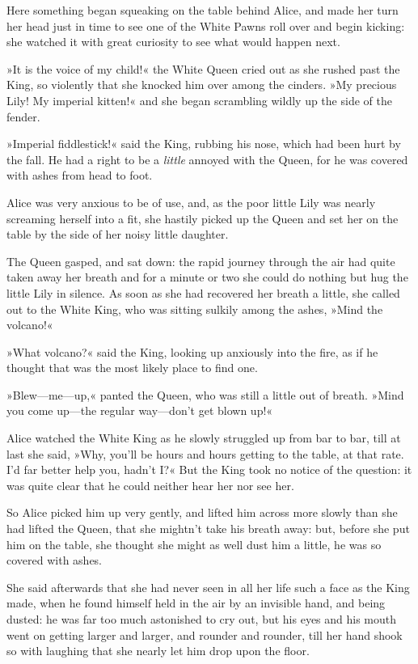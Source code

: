 Here something began squeaking on the table behind Alice, and made her turn her head just in time to see one of the White Pawns roll over and begin kicking: she watched it with great curiosity to see what would happen next.

»It is the voice of my child!« the White Queen cried out as she rushed past the King, so violently that she knocked him over among the cinders. »My precious Lily! My imperial kitten!« and she began scrambling wildly up the side of the fender.

»Imperial fiddlestick!« said the King, rubbing his nose, which had been hurt by the fall. He had a right to be a \textit{little} annoyed with the Queen, for he was covered with ashes from head to foot.

Alice was very anxious to be of use, and, as the poor little Lily was nearly screaming herself into a fit, she hastily picked up the Queen and set her on the table by the side of her noisy little daughter.

The Queen gasped, and sat down: the rapid journey through the air had quite taken away her breath and for a minute or two she could do nothing but hug the little Lily in silence. As soon as she had recovered her breath a little, she called out to the White King, who was sitting sulkily among the ashes, »Mind the volcano!«

»What volcano?« said the King, looking up anxiously into the fire, as if he thought that was the most likely place to find one.

»Blew—me—up,« panted the Queen, who was still a little out of breath. »Mind you come up—the regular way—don't get blown up!«

Alice watched the White King as he slowly struggled up from bar to bar, till at last she said, »Why, you'll be hours and hours getting to the table, at that rate. I'd far better help you, hadn't I?« But the King took no notice of the question: it was quite clear that he could neither hear her nor see her.

So Alice picked him up very gently, and lifted him across more slowly than she had lifted the Queen, that she mightn't take his breath away: but, before she put him on the table, she thought she might as well dust him a little, he was so covered with ashes.

She said afterwards that she had never seen in all her life such a face as the King made, when he found himself held in the air by an invisible hand, and being dusted: he was far too much astonished to cry out, but his eyes and his mouth went on getting larger and larger, and rounder and rounder, till her hand shook so with laughing that she nearly let him drop upon the floor.

